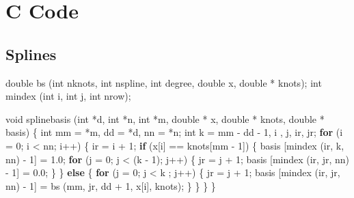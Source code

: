 \documentclass[
  12pt,
]{book}
\newenvironment{Shaded}{\begin{snugshade}}{\end{snugshade}}
\newcommand{\ControlFlowTok}[1]{\textcolor[rgb]{0.13,0.29,0.53}{\textbf{#1}}}
\newcommand{\DataTypeTok}[1]{\textcolor[rgb]{0.13,0.29,0.53}{#1}}
\newcommand{\DecValTok}[1]{\textcolor[rgb]{0.00,0.00,0.81}{#1}}
\newcommand{\FloatTok}[1]{\textcolor[rgb]{0.00,0.00,0.81}{#1}}
\newcommand{\NormalTok}[1]{#1}
\begin{document}
\hypertarget{c-code}{%
\section{C Code}\label{c-code}}

\hypertarget{splines-1}{%
\subsection{Splines}\label{splines-1}}

\begin{Shaded}
\begin{Highlighting}[]

\DataTypeTok{double}\NormalTok{ bs (}\DataTypeTok{int}\NormalTok{ nknots, }\DataTypeTok{int}\NormalTok{ nspline, }\DataTypeTok{int}\NormalTok{ degree, }\DataTypeTok{double}\NormalTok{ x, }\DataTypeTok{double}\NormalTok{ * knots);}
\DataTypeTok{int}\NormalTok{ mindex (}\DataTypeTok{int}\NormalTok{ i, }\DataTypeTok{int}\NormalTok{ j, }\DataTypeTok{int}\NormalTok{ nrow);}

\DataTypeTok{void}\NormalTok{ splinebasis (}\DataTypeTok{int}\NormalTok{ *d, }\DataTypeTok{int}\NormalTok{ *n, }\DataTypeTok{int}\NormalTok{ *m, }\DataTypeTok{double}\NormalTok{ * x, }\DataTypeTok{double}\NormalTok{ * knots, }\DataTypeTok{double}\NormalTok{ * basis) \{}
    \DataTypeTok{int}\NormalTok{ mm = *m, dd = *d, nn = *n;}
    \DataTypeTok{int}\NormalTok{ k = mm {-} dd {-} }\DecValTok{1}\NormalTok{, i , j, ir, jr;}
    \ControlFlowTok{for}\NormalTok{ (i = }\DecValTok{0}\NormalTok{; i \textless{} nn; i++) \{}
\NormalTok{        ir = i + }\DecValTok{1}\NormalTok{;}
        \ControlFlowTok{if}\NormalTok{ (x[i] == knots[mm {-} }\DecValTok{1}\NormalTok{]) \{}
\NormalTok{           basis [mindex (ir, k, nn) {-} }\DecValTok{1}\NormalTok{] =  }\FloatTok{1.0}\NormalTok{;}
            \ControlFlowTok{for}\NormalTok{ (j = }\DecValTok{0}\NormalTok{; j \textless{}  (k {-} }\DecValTok{1}\NormalTok{);  j++) \{}
\NormalTok{                jr = j + }\DecValTok{1}\NormalTok{;}
\NormalTok{                basis [mindex (ir, jr, nn) {-} }\DecValTok{1}\NormalTok{] = }\FloatTok{0.0}\NormalTok{;}
\NormalTok{            \}}
\NormalTok{        \} }\ControlFlowTok{else}\NormalTok{ \{}
            \ControlFlowTok{for}\NormalTok{ (j = }\DecValTok{0}\NormalTok{; j \textless{} k ; j++) \{}
\NormalTok{                jr = j + }\DecValTok{1}\NormalTok{;}
\NormalTok{                basis [mindex (ir, jr, nn) {-} }\DecValTok{1}\NormalTok{] = bs (mm, jr, dd + }\DecValTok{1}\NormalTok{, x[i], knots);}
\NormalTok{            \}}
\NormalTok{        \}}
\NormalTok{    \}}
\NormalTok{\}}


\end{Highlighting}
\end{Shaded}
\end{document}
